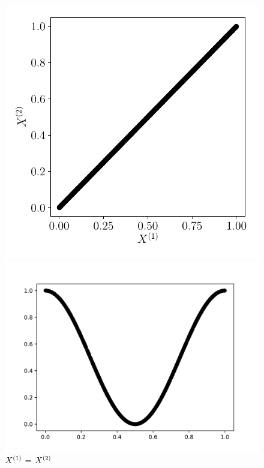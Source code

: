 \documentclass[../main]{subfiles}
\begin{document}
\begin{figure}
	\begin{minipage}{\textwidth}
		\begin{minipage}{0.3\textwidth}
			\includegraphics[width=\textwidth]{2som_id_in.pdf}
			\caption{$X^{({1})}$ = $X^{({2})}$ \label{fig:id}}
		\end{minipage}
		\begin{minipage}{0.3\textwidth}
			\includegraphics[width=\textwidth]{2som_courbe000_inputs.pdf}

\end{minipage}
\end{minipage}
\end{figure}
\end{document}
